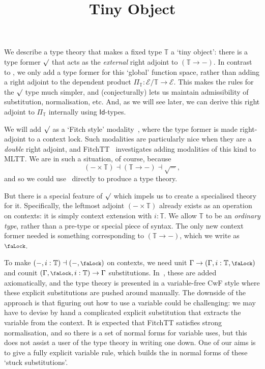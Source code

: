 \documentclass[10pt]{article}
\title{Tiny Object}
\author{}
\date{}
\theoremstyle{definition}
\newcommand{\Idsym}{\mathsf{Id}}
\newcommand{\lock}{\mathchoice
{\scalebox{0.8}{\text{\faLock}}}
{\scalebox{0.8}{\text{\faLock}}}
{\scalebox{0.5}{\text{\faLock}}}
{\scalebox{0.4}{\text{\faLock}}}
}
\newcommand{\Tiny}{\mathbb{T}}
\newcommand{\rformu}[1]{\surd #1}
\begin{document}
\maketitle

We describe a type theory that makes a fixed type $\Tiny$ a `tiny object': there is a type former $\rformu$ that acts as the \emph{external} right adjoint to $(\Tiny \to -)$. In contrast to \cite[Section 2]{transpension}, we only add a type former for this `global' function space, rather than adding a right adjoint to the dependent product $\Pi_\Tiny : \mathcal{E}/\Tiny \to \mathcal{E}$. This makes the rules for the $\rformu$ type much simpler, and (conjecturally) lets us maintain admissibility of substitution, normalisation, etc. And, as we will see later, we can derive this right adjoint to $\Pi_\Tiny$ internally using $\Idsym$-types.

We will add $\rformu$ as a `Fitch style' modality~\cite{clouston:fitch-style}, where the type former is made right-adjoint to a context lock. Such modalities are particularly nice when they are a \emph{double} right adjoint, and FitchTT~\cite{fitchtt} investigates adding modalities of this kind to MLTT. We are in such a situation, of course, because \[{(- \times \Tiny) \dashv (\Tiny \to -) \dashv \rformu -},\] and so we could use~\cite{fitchtt} directly to produce a type theory.

But there is a special feature of $\rformu$ which impels us to create a specialised theory for it. Specifically, the leftmost adjoint $(- \times \Tiny)$ already exists as an operation on contexts: it is simply context extension with $i : \Tiny$. We allow $\Tiny$ to be an \emph{ordinary type}, rather than a pre-type or special piece of syntax. The only new context former needed is something corresponding to $(\Tiny \to -)$, which we write as $\lock$.

To make $(-,i:\Tiny) \dashv (-,\lock)$ on contexts, we need unit $\Gamma \to (\Gamma,i : \Tiny, \lock)$ and counit $(\Gamma,\lock,i : \Tiny) \to \Gamma$ substitutions. In~\cite{fitchtt}, these are added axiomatically, and the type theory is presented in a variable-free CwF style where these explicit substitutions are pushed around manually. The downside of the approach is that figuring out how to use a variable could be challenging: we may have to devise by hand a complicated explicit substitution that extracts the variable from the context. It is expected that FitchTT satisfies strong normalisation, and so there is a set of normal forms for variable uses, but this does not assist a user of the type theory in writing one down.  One of our aims is to give a fully explicit variable rule, which builds the in normal forms of these `stuck substitutions'.
\end{document}

